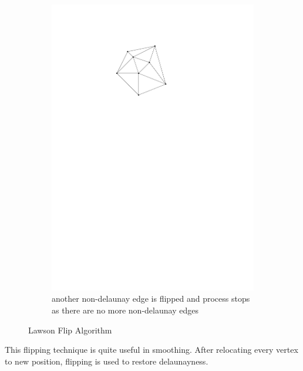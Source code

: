 \begin{figure}[h]
    \begin{subfigure}[t]{0.5\textwidth}
        \centering
        \includegraphics{images/law_flip_c.pdf}
        \caption{another non-delaunay edge is flipped and process stops as there are no more non-delaunay edges}   
    \end{subfigure} 
    \caption{Lawson Flip Algorithm}
    \label{fig:law_flip}
\end{figure}

This flipping \cite{lawson} technique is quite useful in smoothing. After relocating every vertex to new position, flipping is used to restore delaunayness.

